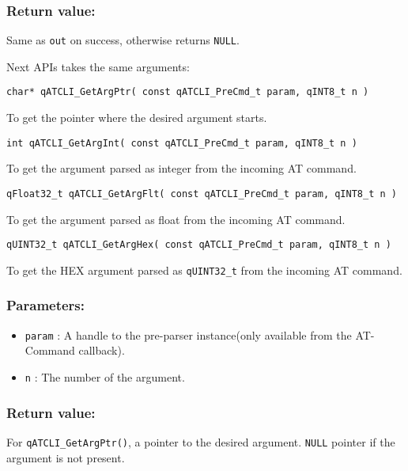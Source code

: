 \subsubsection*{Return value:}
Same as \lstinline{out} on success, otherwise returns \lstinline{NULL}.

\noindent\hrulefill
\newline
Next APIs takes the same arguments:
\medskip

\begin{lstlisting}[style=CStyle]
char* qATCLI_GetArgPtr( const qATCLI_PreCmd_t param, qINT8_t n )
\end{lstlisting}

To get the pointer where the desired argument starts. 

\begin{lstlisting}[style=CStyle]
int qATCLI_GetArgInt( const qATCLI_PreCmd_t param, qINT8_t n )
\end{lstlisting}

To get the argument parsed as integer from the incoming AT command. 

\begin{lstlisting}[style=CStyle]
qFloat32_t qATCLI_GetArgFlt( const qATCLI_PreCmd_t param, qINT8_t n )
\end{lstlisting}

To get the argument parsed as float from the incoming AT command. 

\begin{lstlisting}[style=CStyle]
qUINT32_t qATCLI_GetArgHex( const qATCLI_PreCmd_t param, qINT8_t n )
\end{lstlisting}

To get the HEX argument parsed as \lstinline{qUINT32_t} from the incoming AT command. 


\subsubsection*{Parameters:}
\begin{itemize}
    \item \lstinline{param} : A handle to the pre-parser instance(only available from the AT-Command callback).
    \item \lstinline{n} : The number of the argument.
\end{itemize}

\subsubsection*{Return value:}
For \lstinline{qATCLI_GetArgPtr()}, a pointer to the desired argument. \lstinline{NULL} pointer if the argument is not present.

